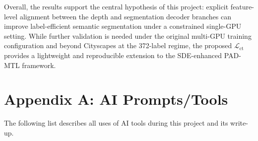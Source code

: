 \documentclass[
  oneside,
  author={Shijie Lu},
  degree={BSc},
  title={Label-Efficient Semantic Segmentation via Self-Supervised Depth Estimation and Cross-Task Consistency},
  unit={COMS30045},
  subtitle={}
]{dissertation}
\begin{document}
\noindent
Overall, the results support the central hypothesis of this project:
explicit feature-level alignment between the depth and segmentation
decoder branches can improve label-efficient semantic segmentation under
a constrained single-GPU setting. While further validation is needed
under the original multi-GPU training configuration and beyond Cityscapes
at the 372-label regime, the proposed $\mathcal{L}_\text{ct}$ provides a
lightweight and reproducible extension to the SDE-enhanced PAD-MTL
framework.



\appendix

\chapter{Appendix A: AI Prompts/Tools}
\label{appx:ai_prompt}

\noindent
The following list describes all uses of AI tools during this project
and its write-up.
\end{document}
